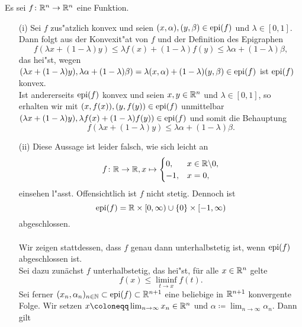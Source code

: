 
Es sei $f\colon\mathbb{R}^n\to\mathbb{R}^n$ eine Funktion.

\begin{itemize}
 \item[(i)] Sei $f$ zus"atzlich konvex und seien $(x,\alpha),(y,\beta)\in\operatorname{epi}(f)$ und $\lambda\in[0,1]$.
 Dann folgt aus der Konvexit"at von $f$ und der Definition des Epigraphen
 \begin{displaymath}
  f(\lambda x+(1-\lambda)y)\leq \lambda f(x)+(1-\lambda)f(y)\leq \lambda\alpha+(1-\lambda)\beta,
 \end{displaymath}
 das hei"st, wegen $(\lambda x+(1-\lambda)y),\lambda\alpha+(1-\lambda)\beta)=\lambda(x,\alpha)+(1-\lambda)(y,\beta)\in\operatorname{epi}(f)$
 ist $\operatorname{epi}(f)$ konvex.\\
 Ist andererseits $\operatorname{epi}(f)$ konvex und seien $x,y\in\mathbb{R}^n$ und $\lambda\in[0,1]$, so erhalten wir mit
 $(x,f(x)),(y,f(y))\in\operatorname{epi}(f)$ unmittelbar $(\lambda x+(1-\lambda)y),\lambda f(x)+(1-\lambda)f(y))\in \operatorname{epi}(f)$ und somit die Behauptung
 \begin{displaymath}
  f(\lambda x+(1-\lambda)y)\leq\lambda\alpha+(1-\lambda)\beta.
 \end{displaymath}
 \item[(ii)] Diese Aussage ist leider falsch, wie sich leicht an 
 \begin{displaymath}
  f\colon\mathbb{R}\to\mathbb{R}, x\mapsto \begin{cases}
                       0, &x\in\mathbb{R}\backslash{0},\\
                       -1, &x=0,
                      \end{cases}
 \end{displaymath}
 einsehen l"asst. Offensichtlich ist $f$ nicht stetig. Dennoch ist 
 \begin{displaymath}
  \operatorname{epi}(f)=\mathbb{R}\times[0,\infty)\cup\{0\}\times[-1,\infty)
 \end{displaymath}
 abgeschlossen.
 \\ \\
 Wir zeigen stattdessen, dass $f$ genau dann unterhalbstetig ist, wenn $\operatorname{epi}(f)$ abgeschlossen ist.\\
 Sei dazu zunächst $f$ unterhalbstetig, das hei"st, für alle $x\in\mathbb{R}^n$ gelte 
 \begin{displaymath}
  f(x)\leq\liminf_{t\to x}f(t).
 \end{displaymath}
 Sei ferner $(x_n,\alpha_n)_{n\in\mathbb{N}}\subset\operatorname{epi}(f)\subset\mathbb{R}^{n+1}$ eine beliebige in $\mathbb{R}^{n+1}$ konvergente Folge.
 Wir setzen $x\coloneqq \lim_{n\to\infty} x_n\in\Rn$ und $\alpha\coloneqq\lim_{n\to\infty}\alpha_n$. Dann gilt

\end{itemize}
